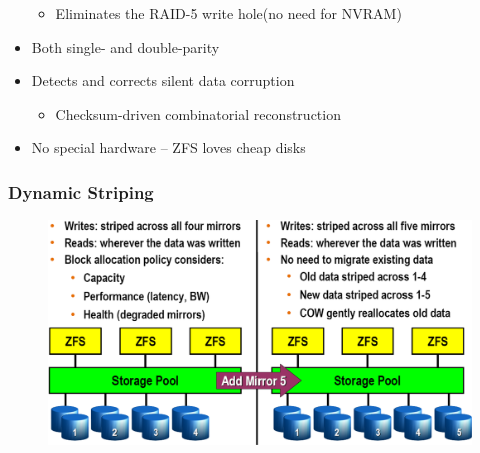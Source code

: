 \begin{frame}[fragile]
\begin{itemize}
\begin{itemize}
            \item Eliminates the RAID-5 write hole(no need for NVRAM)
        \end{itemize}
        \item Both single- and double-parity
        \item Detects and corrects silent data corruption
        \begin{itemize}
            \item Checksum-driven combinatorial reconstruction
        \end{itemize}
        \item {\color{red}No special hardware} – ZFS loves cheap disks
    \end{itemize}
\end{frame}
% 
% 
% 
% 
\begin{frame}[fragile]
    \frametitle{Dynamic Striping}
    \begin{figure}
    \includegraphics[width=0.8\linewidth]{figs/ZFS-striping.png}
    \end{figure}
\end{frame}
